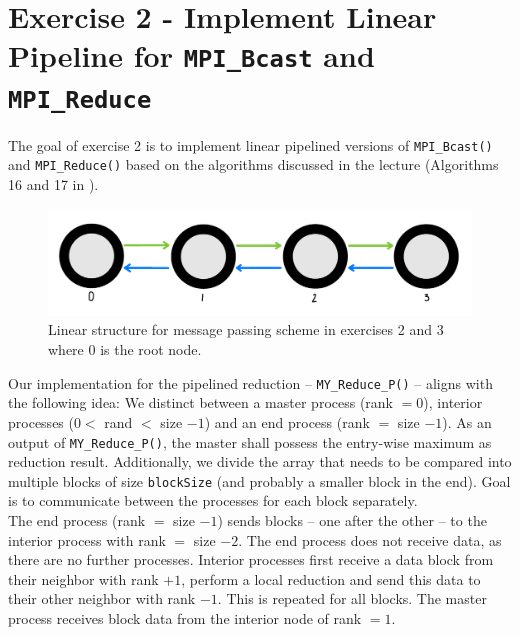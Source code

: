 \section{Exercise 2 - Implement Linear Pipeline for \texttt{MPI\_Bcast} and \texttt{MPI\_Reduce}}

The goal of exercise 2 is to implement linear pipelined versions of \texttt{MPI\_Bcast()} and \texttt{MPI\_Reduce()} 
based on the algorithms discussed in the lecture 
(Algorithms 16 and 17 in \cite{lecture_notes_traeff_collectives}). \\

\begin{figure}[h]
    \begin{center}
        \includegraphics[width=0.7\linewidth]{figures/sketch_linear.pdf}
        \caption{Linear structure for message passing scheme in 
        exercises 2 and 3 where 0 is the root node.}
        \label{Ex2_sketch_p}
    \end{center}
\end{figure}

Our implementation for the pipelined reduction -- \texttt{MY\_Reduce\_P()} -- aligns with the following idea: We 
distinct between a master process (rank $= 0$), interior processes ($0 <$ rand $<$ size $-1$) and an end process 
(rank $=$ size $-1$). As an output of \texttt{MY\_Reduce\_P()}, the master shall possess the entry-wise maximum as 
reduction result. Additionally, we divide the array that needs to be compared into multiple blocks of size 
\texttt{blockSize} (and probably a smaller block in the end). Goal is to communicate between the processes for each 
block separately.  \\

The end process (rank $=$ size $-1$) sends blocks -- one after the other -- to the interior process with 
rank $=$ size $-2$. The end process does not receive data, as there are no further processes. Interior processes 
first receive a data block from their neighbor with rank $+1$, perform a local reduction and send this data to their 
other neighbor with rank $-1$. This is repeated for all blocks. The master process receives block data from the interior 
node of rank $=1$. \\

